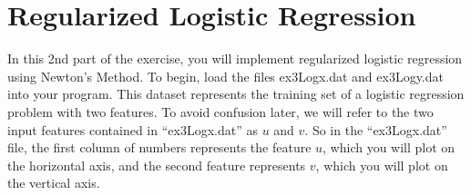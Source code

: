 \documentclass[10pt,a4paper]{article}
\begin{document}
  
  









\section{Regularized Logistic Regression}
%
  In this 2nd part of the exercise, you will implement regularized logistic regression using Newton's Method. To begin, load the files ex3Logx.dat and ex3Logy.dat into your program. This dataset represents the training set of a logistic regression problem with two features. To avoid confusion later, we will refer to the two input features contained in ``ex3Logx.dat'' as $u$ and $v$. So in the ``ex3Logx.dat'' file, the first column of numbers represents the feature $u$, which you will plot on the horizontal axis, and the second feature represents $v$, which you will plot on the vertical axis.
\end{document}
